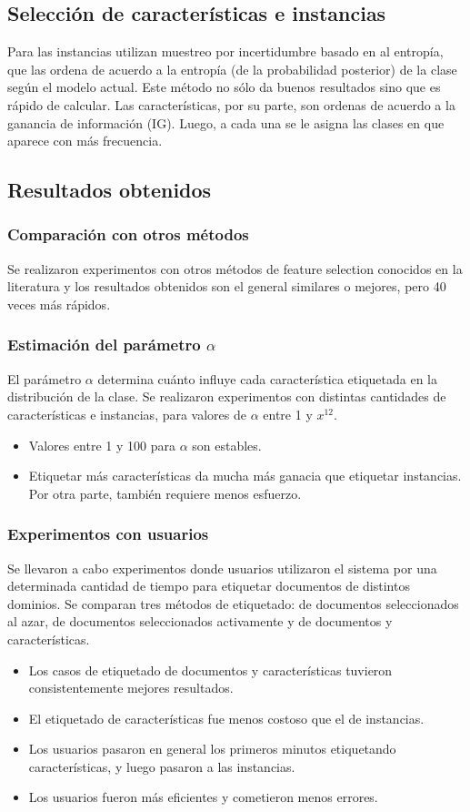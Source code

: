 \documentclass[11pt,spanish]{article}
\begin{document}
\subsection{Selección de características e instancias}
Para las instancias utilizan muestreo por incertidumbre basado en al entropía,
que las ordena de acuerdo a la entropía (de la probabilidad posterior) de la
clase según el modelo actual. Este método no sólo da buenos resultados sino
que es rápido de calcular.
Las características, por su parte, son ordenas de acuerdo a la ganancia de
información (IG). Luego, a cada una se le asigna las clases en que aparece con
más frecuencia.

\subsection{Resultados obtenidos}
\subsubsection{Comparación con otros métodos}
Se realizaron experimentos con otros métodos de feature selection conocidos en
la literatura y los resultados obtenidos son el general similares o mejores,
pero 40 veces más rápidos.
\subsubsection{Estimación del parámetro $\alpha$}
El parámetro $\alpha$ determina cuánto influye cada característica etiquetada
en la distribución de la clase. Se realizaron experimentos con distintas
cantidades de características e instancias, para valores de $\alpha$ entre 1 y
$x^{12}$.
\begin{itemize}
    \item Valores entre 1 y 100 para $\alpha$ son estables.
    \item Etiquetar más características da mucha más ganacia que etiquetar
    instancias. Por otra parte, también requiere menos esfuerzo.
\end{itemize}
\subsubsection{Experimentos con usuarios}
Se llevaron a cabo experimentos donde usuarios utilizaron el sistema por una
determinada cantidad de tiempo para etiquetar documentos de distintos dominios.
Se comparan tres métodos de etiquetado: de documentos seleccionados al azar,
de documentos seleccionados activamente y de documentos y características.
\begin{itemize}
    \item Los casos de etiquetado de documentos y características tuvieron
    consistentemente mejores resultados.
    \item El etiquetado de características fue menos costoso que el de
    instancias.
    \item Los usuarios pasaron en general los primeros minutos etiquetando
    características, y luego pasaron a las instancias.
    \item Los usuarios fueron más eficientes y cometieron menos errores.
\end{itemize}
\end{document}
